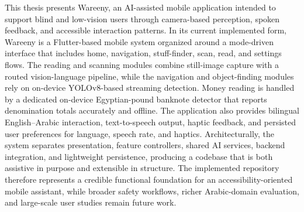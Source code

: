 \documentclass[12pt,a4paper]{report}
\begin{document}
This thesis presents Wareeny, an AI-assisted mobile application intended to support blind and low-vision users through camera-based perception, spoken feedback, and accessible interaction patterns. In its current implemented form, Wareeny is a Flutter-based mobile system organized around a mode-driven interface that includes home, navigation, stuff-finder, scan, read, and settings flows. The reading and scanning modules combine still-image capture with a routed vision-language pipeline, while the navigation and object-finding modules rely on on-device YOLOv8-based streaming detection. Money reading is handled by a dedicated on-device Egyptian-pound banknote detector that reports denomination totals accurately and offline. The application also provides bilingual English--Arabic interaction, text-to-speech output, haptic feedback, and persisted user preferences for language, speech rate, and haptics. Architecturally, the system separates presentation, feature controllers, shared AI services, backend integration, and lightweight persistence, producing a codebase that is both assistive in purpose and extensible in structure. The implemented repository therefore represents a credible functional foundation for an accessibility-oriented mobile assistant, while broader safety workflows, richer Arabic-domain evaluation, and large-scale user studies remain future work.
\end{document}

